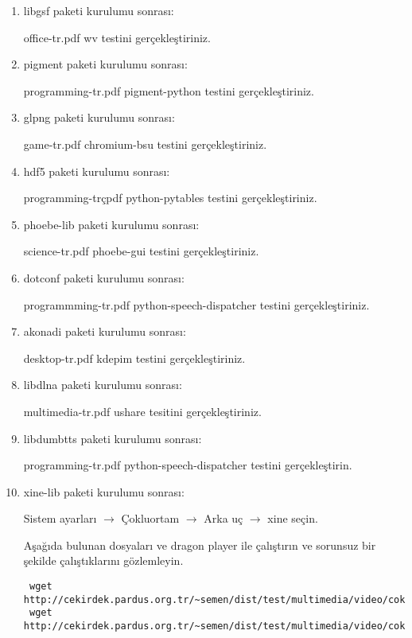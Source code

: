 \documentclass[a4paper,10pt]{article}
\begin{document}
\begin{enumerate}
\item libgsf paketi kurulumu sonrası:

office-tr.pdf wv testini gerçekleştiriniz.

\item pigment paketi kurulumu sonrası:

programming-tr.pdf pigment-python testini gerçekleştiriniz.

\item glpng paketi kurulumu sonrası:

game-tr.pdf chromium-bsu testini gerçekleştiriniz.

\item hdf5 paketi kurulumu sonrası:

programming-trçpdf python-pytables testini gerçekleştiriniz.

\item phoebe-lib paketi kurulumu sonrası:

science-tr.pdf phoebe-gui testini gerçekleştiriniz.

\item dotconf paketi kurulumu sonrası:

programmming-tr.pdf python-speech-dispatcher testini gerçekleştiriniz.

\item akonadi paketi kurulumu sonrası:

desktop-tr.pdf kdepim testini gerçekleştiriniz.

\item libdlna paketi kurulumu sonrası:

multimedia-tr.pdf ushare tesitini gerçekleştiriniz.

\item libdumbtts paketi kurulumu sonrası:

programming-tr.pdf python-speech-dispatcher testini gerçekleştirin.

\item xine-lib paketi kurulumu sonrası:

Sistem ayarları $\rightarrow$ Çokluortam $\rightarrow$ Arka uç $\rightarrow$ xine seçin. 

Aşağıda bulunan dosyaları ve dragon player ile çalıştırın ve sorunsuz bir şekilde çalıştıklarını gözlemleyin.

\begin{verbatim}
 wget http://cekirdek.pardus.org.tr/~semen/dist/test/multimedia/video/cokluortam/DVD.mpg
 wget http://cekirdek.pardus.org.tr/~semen/dist/test/multimedia/video/cokluortam/Lake_dance_XviD.AVI
\end{verbatim}



\end{enumerate}
\end{document}
